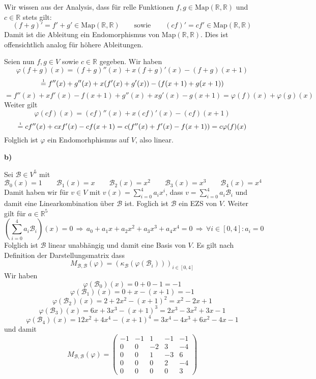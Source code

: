 \documentclass[a4paper,graphics,11pt]{article}
\newcommand{\up}[2]{\mathrel{\overset{\makebox[0pt]{\mbox{\normalfont\tiny #2}}}{#1}}}
\begin{document}
Wir wissen aus der Analysis, dass für relle Funktionen $f,g \in \text{Map}(\mathbb{R}, \mathbb{R})$ und $c \in \mathbb{R}$ stets gilt:
\begin{equation}
    (f+g)' = f'+g' \in \text{Map}(\mathbb{R}, \mathbb{R})
    \qquad\text{sowie}\qquad
    (cf)' = cf' \in \text{Map}(\mathbb{R}, \mathbb{R})
\end{equation}
Damit ist die Ableitung ein Endomorphismus von Map$(\mathbb{R}, \mathbb{R})$. Dies ist offensichtlich analog für höhere Ableitungen.

Seien nun $f,g \in V$ sowie $c \in \mathbb{R}$ gegeben. Wir haben
$$
    \varphi(f+g)(x)
    = (f+g)''(x) + x(f+g)'(x) - (f+g)(x+1)
$$$$
    \up{=}{1} f''(x) + g''(x) + x(f'(x)+g'(x)) - (f(x+1)+g(x+1))
$$$$
    = f''(x) + xf'(x) - f(x+1) + g''(x) +xg'(x) - g(x+1)
    = \varphi(f)(x) + \varphi(g)(x)
$$
Weiter gilt
$$
    \varphi(cf)(x)
    = (cf)''(x) + x(cf)'(x) - (cf)(x+1)
$$$$
    \up{=}{1} cf''(x) + cxf'(x) - cf(x+1)
    = c(f''(x)+f'(x)-f(x+1))
    = c\varphi(f)(x)
$$
Folglich ist $\varphi$ ein Endomorhphismus auf $V$, also linear.

\newpage

\textbf{b)}

Sei $\mathcal{B} \in V^5$ mit
$$
    \mathcal{B}_0(x) = 1
    \qquad
    \mathcal{B}_1(x) = x
    \qquad
    \mathcal{B}_2(x) = x^2
    \qquad
    \mathcal{B}_3(x) = x^3
    \qquad
    \mathcal{B}_4(x) = x^4
$$
Damit haben wir für $v \in V$ mit $v(x) = \sum_{i=0}^{4} a_ix^i$, dass $v = \sum_{i=0}^{4} a_i\mathcal{B}_i$
und damit eine Linearkombination über $\mathcal{B}$ ist. Foglich ist $\mathcal{B}$ ein EZS von $V$.
Weiter gilt für $a \in \mathbb{R}^5$
$$
    \left(\sum_{i=0}^{4} a_i\mathcal{B}_i\right)(x) = 0
    \,\Longrightarrow\, a_0 + a_1x + a_2x^2 + a_3x^3 + a_4x^4 = 0
    \,\Longrightarrow\, \forall i \in [0,4] : a_i = 0
$$
Folglich ist $\mathcal{B}$ linear unabhängig und damit eine Basis von $V$.
Es gilt nach Definition der Darstellungsmatrix dass
$$
    M_{\mathcal{B}, \mathcal{B}}(\varphi) = (\kappa_\mathcal{B}(\varphi(\mathcal{B}_i)))_{i \in [0,4]}
$$
Wir haben
$$
    \varphi(\mathcal{B}_0)(x) = 0 + 0 - 1 = -1
$$$$
    \varphi(\mathcal{B}_1)(x) = 0 + x - (x+1) = -1
$$$$
    \varphi(\mathcal{B}_2)(x) = 2 + 2x^2 - (x+1)^2 = x^2-2x+1
$$$$
    \varphi(\mathcal{B}_3)(x) = 6x + 3x^3 - (x+1)^3 = 2x^3-3x^2+3x-1
$$$$
    \varphi(\mathcal{B}_4)(x) = 12x^2 + 4x^4 - (x+1)^4 = 3x^4 -4x^3+6x^2-4x-1
$$
und damit
$$
    M_{\mathcal{B}, \mathcal{B}}(\varphi)
    = \begin{pmatrix}
        -1  & -1    & 1     & -1    & -1\\
        0   & 0     & -2    & 3     & -4\\
        0   & 0     & 1     & -3    & 6\\
        0   & 0     & 0     & 2     & -4\\
        0   & 0     & 0     & 0     & 3
    \end{pmatrix}
$$
\end{document}
